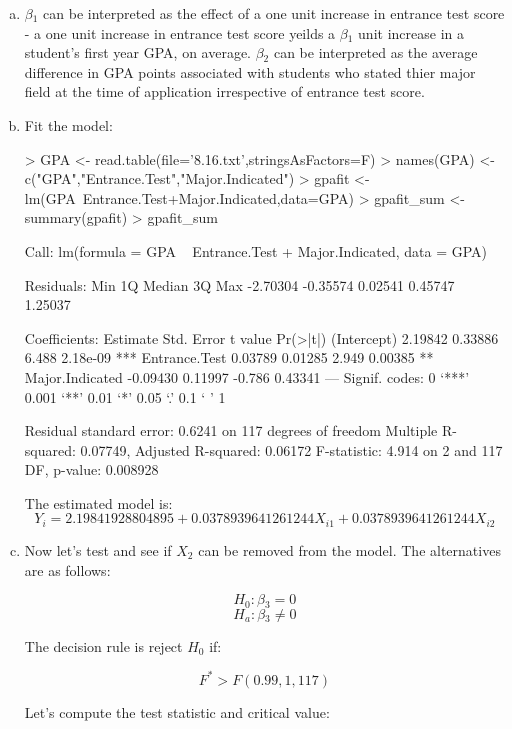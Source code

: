 \documentclass{article}
\begin{document}
\begin{enumerate}[a)]
\item{} $\beta{}_1$ can be interpreted as the effect of a one unit increase in entrance test score - a one unit increase in entrance test score yeilds a $\beta{}_1$ unit increase in a student's first year GPA, on average. $\beta{}_2$ can be interpreted as the average difference in GPA points associated with students who stated thier major field at the time of application irrespective of entrance test score.
\item{} Fit the model:

\begin{Schunk}
\begin{Sinput}
> GPA <- read.table(file='8.16.txt',stringsAsFactors=F)
> names(GPA) <- c("GPA","Entrance.Test","Major.Indicated")
> gpafit <- lm(GPA~Entrance.Test+Major.Indicated,data=GPA)
> gpafit_sum <- summary(gpafit)
> gpafit_sum
\end{Sinput}
\begin{Soutput}
Call:
lm(formula = GPA ~ Entrance.Test + Major.Indicated, data = GPA)

Residuals:
     Min       1Q   Median       3Q      Max 
-2.70304 -0.35574  0.02541  0.45747  1.25037 

Coefficients:
                Estimate Std. Error t value Pr(>|t|)    
(Intercept)      2.19842    0.33886   6.488 2.18e-09 ***
Entrance.Test    0.03789    0.01285   2.949  0.00385 ** 
Major.Indicated -0.09430    0.11997  -0.786  0.43341    
---
Signif. codes:  0 ‘***’ 0.001 ‘**’ 0.01 ‘*’ 0.05 ‘.’ 0.1 ‘ ’ 1

Residual standard error: 0.6241 on 117 degrees of freedom
Multiple R-squared:  0.07749,	Adjusted R-squared:  0.06172 
F-statistic: 4.914 on 2 and 117 DF,  p-value: 0.008928
\end{Soutput}
\end{Schunk}

The estimated model is:
$$ Y_i = 2.19841928804895 + 0.0378939641261244X_{i1} + 0.0378939641261244X_{i2} $$

\item{} Now let's test and see if $X_2$ can be removed from the model. The alternatives are as follows:

$$ H_0: \beta{}_3 = 0 $$
$$ H_a: \beta{}_3 \neq{} 0 $$

The decision rule is reject $H_0$ if:

$$ F^* > F(0.99,1,117) $$

Let's compute the test statistic and critical value:


\end{enumerate}
\end{document}
